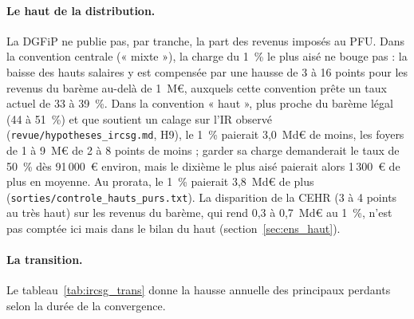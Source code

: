 \documentclass[11pt,a4paper]{article}
\begin{document}
\paragraph{Le haut de la distribution.} La DGFiP ne publie pas, par tranche, la part des revenus imposés au PFU. Dans la
convention centrale (« mixte »), la charge du 1~\% le plus aisé ne bouge pas : la baisse des hauts salaires y est
compensée par une hausse de 3 à 16 points pour les revenus du barème au-delà de 1~M€, auxquels cette convention prête un
taux actuel de 33 à 39~\%. Dans la convention « haut », plus proche du barème légal (44 à 51~\%) et que soutient un
calage sur l'IR observé (\texttt{revue/hypotheses\_ircsg.md}, H9), le 1~\% paierait 3,0~Md€ de moins, les foyers de 1 à
9~M€ de 2 à 8 points de moins ; garder sa charge demanderait le taux de 50~\% dès 91\,000~€ environ, mais le dixième le
plus aisé paierait alors 1\,300~€ de plus en moyenne. Au prorata, le 1~\% paierait 3,8~Md€ de plus
(\texttt{sorties/controle\_hauts\_purs.txt}). La disparition de la CEHR (3 à 4 points au très haut) sur les revenus du
barème, qui rend 0,3 à 0,7~Md€ au 1~\%, n'est pas comptée ici mais dans le bilan du haut (section~\ref{sec:ens_haut}).

\paragraph{La transition.} Le tableau~\ref{tab:ircsg_trans} donne la hausse annuelle des principaux perdants selon la
durée de la convergence.
\end{document}
